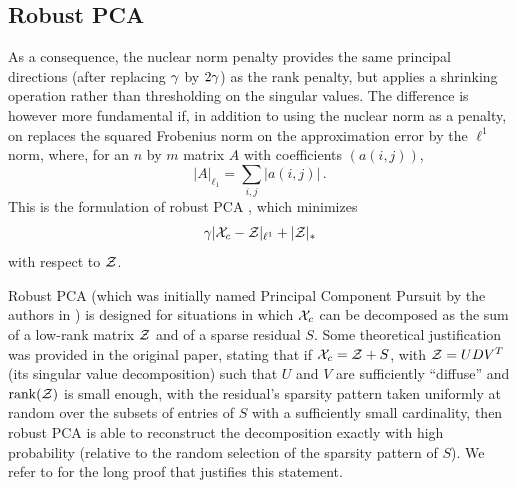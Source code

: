 \subsection{Robust PCA}
As a consequence, the nuclear norm penalty provides the same principal directions (after replacing $\gamma$ by $2\gamma$) as the rank penalty, but applies a shrinking operation rather than thresholding on the singular values. The difference is however more fundamental if, in addition to using the nuclear norm as a penalty, on replaces the squared Frobenius norm on the approximation error by the $\ell^1$ norm, where, for an $n$ by $m$ matrix $A$ with coefficients $(a(i,j))$,
\[
|A|_{\ell_1} = \sum_{i,j} |a(i,j)|\,.
\]
This is the formulation of  robust PCA \citep{candes2011robust}, which minimizes
\begin{equation}
\label{eq:r.pca}
{\gamma} |{\mathcal X}_c - {\mathcal Z}|_{\ell^1}+  |{\mathcal Z}|_*
\end{equation}
with respect to ${\mathcal Z}$.

Robust PCA (which was initially named Principal Component Pursuit by the authors in \citet{candes2011robust}) is designed for situations in which ${\mathcal X}_c$ can be decomposed as the sum of a low-rank matrix ${\mathcal Z}$ and of a sparse residual $S$. Some theoretical justification was provided in the original paper, stating that if ${\mathcal X}_c = {\mathcal Z} + S$, with ${\mathcal Z} = UDV^T$ (its singular value decomposition) such that $U$ and $V$ are sufficiently ``diffuse'' and $\mathrm{rank}({\mathcal Z})$ is small enough, with the residual's sparsity pattern taken uniformly at random over the subsets of entries of $S$ with a sufficiently  small cardinality, then robust PCA is able to reconstruct the decomposition exactly with high probability (relative to the random selection of the sparsity pattern of $S$). We refer to \citet{candes2011robust} for the long proof that justifies this statement.

